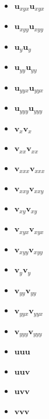 \documentclass[unicode,11pt,a4paper,oneside,numbers=endperiod,openany]{scrartcl}
\begin{document}
\begin{multicols}{5}
\begin{itemize}[noitemsep, topsep=0pt, left=0pt]
    \item $\mathbf{u}_{xyx} \mathbf{u}_{xyx}$
    \item $\mathbf{u}_{xyy} \mathbf{u}_{xyy}$
    \item $\mathbf{u}_{y} \mathbf{u}_{y}$
    \item $\mathbf{u}_{yy} \mathbf{u}_{yy}$
    \item $\mathbf{u}_{yyx} \mathbf{u}_{yyx}$
    \item $\mathbf{u}_{yyy} \mathbf{u}_{yyy}$
    \item $\mathbf{v}_{x} \mathbf{v}_{x}$
    \item $\mathbf{v}_{xx} \mathbf{v}_{xx}$
    \item $\mathbf{v}_{xxx} \mathbf{v}_{xxx}$
    \item $\mathbf{v}_{xxy} \mathbf{v}_{xxy}$
    \item $\mathbf{v}_{xy} \mathbf{v}_{xy}$
    \item $\mathbf{v}_{xyx} \mathbf{v}_{xyx}$
    \item $\mathbf{v}_{xyy} \mathbf{v}_{xyy}$
    \item $\mathbf{v}_{y} \mathbf{v}_{y}$
    \item $\mathbf{v}_{yy} \mathbf{v}_{yy}$
    \item $\mathbf{v}_{yyx} \mathbf{v}_{yyx}$
    \item $\mathbf{v}_{yyy} \mathbf{v}_{yyy}$
    \item $\mathbf{u} \mathbf{u} \mathbf{u}$
    \item $\mathbf{u} \mathbf{u} \mathbf{v}$
    \item $\mathbf{u} \mathbf{v} \mathbf{v}$
    \item $\mathbf{v} \mathbf{v} \mathbf{v}$
\end{itemize}
\end{multicols}
\end{document}
